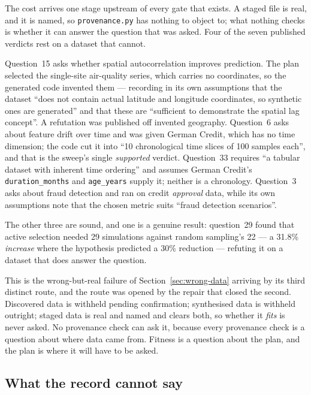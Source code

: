 The cost arrives one stage upstream of every gate that exists. A staged file is
real, and it is named, so \texttt{provenance.py} has nothing to object to; what
nothing checks is whether it can answer the question that was asked. Four of the
seven published verdicts rest on a dataset that cannot.

Question~15 asks whether spatial autocorrelation improves prediction. The plan
selected the single-site air-quality series, which carries no coordinates, so the
generated code invented them --- recording in its own assumptions that the dataset
``does not contain actual latitude and longitude coordinates, so synthetic ones are
generated'' and that these are ``sufficient to demonstrate the spatial lag
concept''. A refutation was published off invented geography. Question~6 asks about
feature drift over time and was given German Credit, which has no time dimension;
the code cut it into ``10 chronological time slices of 100 samples each'', and that
is the sweep's single \emph{supported} verdict. Question~33 requires ``a tabular
dataset with inherent time ordering'' and assumes German Credit's
\texttt{duration\_months} and \texttt{age\_years} supply it; neither is a
chronology. Question~3 asks about fraud detection and ran on credit \emph{approval}
data, while its own assumptions note that the chosen metric suits ``fraud detection
scenarios''.

The other three are sound, and one is a genuine result: question~29 found that
active selection needed 29 simulations against random sampling's 22 --- a 31.8\%
\emph{increase} where the hypothesis predicted a 30\% reduction --- refuting it on a
dataset that does answer the question.

This is the wrong-but-real failure of Section~\ref{sec:wrong-data} arriving by its
third distinct route, and the route was opened by the repair that closed the second.
Discovered data is withheld pending confirmation; synthesised data is withheld
outright; staged data is real and named and clears both, so whether it \emph{fits}
is never asked. No provenance check can ask it, because every provenance check is a
question about where data came from. Fitness is a question about the plan, and the
plan is where it will have to be asked.

\subsection{What the record cannot say}
\label{sec:read-not-recorded}

